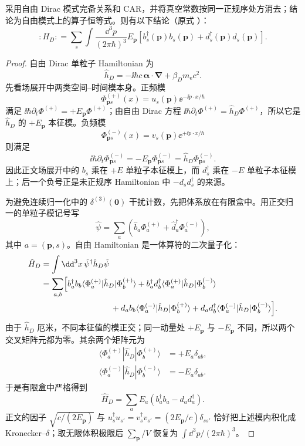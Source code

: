 \begin{proposition}
采用自由 Dirac 模式完备关系和 CAR，并将真空常数按同一正规序处方消去；结论为自由模式上的算子恒等式。则有以下结论（原式 ）：
\begin{equation*}
\boxed{
:\!H_D\!:
=\sum_s\int\frac{\dd^3 p}{(2\pi\hbar)^3}E_{\mathbf p}
\left[b_s^\dagger(\mathbf p)b_s(\mathbf p)
+d_s^\dagger(\mathbf p)d_s(\mathbf p)\right].}
\end{equation*}
\end{proposition}
\begin{proof}
自由 Dirac 单粒子 Hamiltonian 为
\[
 \hat h_D=-\ii\hbar c\,\boldsymbol\alpha\cdot\boldsymbol\nabla
 +\beta_Dm_{\mathrm e} c^2.
\]
先看场展开中两类空间--时间模本身。正频模
\[
 \Phi^{(+)}_{\mathbf p s}(x)
 =u_s(\mathbf p)\ee^{-\ii p\cdot x/\hbar}
\]
满足 $\ii\hbar\partial_t\Phi^{(+)}=+E_{\mathbf p}\Phi^{(+)}$；由自由 Dirac 方程
$\ii\hbar\partial_t\Phi^{(+)}=\hat h_D\Phi^{(+)}$，所以它是 $\hat h_D$ 的 $+E_{\mathbf p}$ 本征模。负频模
\[
 \Phi^{(-)}_{\mathbf p s}(x)
 =v_s(\mathbf p)\ee^{+\ii p\cdot x/\hbar}
\]
则满足
\[
 \ii\hbar\partial_t\Phi^{(-)}_{\mathbf p s}
 =-E_{\mathbf p}\Phi^{(-)}_{\mathbf p s}
 =\hat h_D\Phi^{(-)}_{\mathbf p s}.
\]
因此正文场展开中的 $b_s$ 乘在 $+E$ 单粒子本征模上，而 $d_s^\dagger$ 乘在 $-E$ 单粒子本征模上；后一个负号正是未正规序 Hamiltonian 中
$-d_sd_s^\dagger$ 的来源。

为避免连续归一化中的 $\delta^{(3)}(\mathbf0)$ 干扰计数，先把体系放在有限盒中。用正交归一的单粒子模记号写
\[
 \hat\psi
 =\sum_a\left(
 \hat b_a\Phi_a^{(+)}+\hat d_a^\dagger\Phi_a^{(-)}
 \right),
\]
其中 $a=(\mathbf p,s)$。自由 Hamiltonian 是一体算符的二次量子化：
\begin{align*}
 \hat H_D
 &=\int\dd^3x\,\hat\psi^\dagger\hat h_D\hat\psi\\
 &=\sum_{a,b}\Bigl[
 b_a^\dagger b_b\langle\Phi_a^{(+)}|\hat h_D|\Phi_b^{(+)}\rangle
 +b_a^\dagger d_b^\dagger\langle\Phi_a^{(+)}|\hat h_D|\Phi_b^{(-)}\rangle\\
 &\hspace{30mm}
 +d_a b_b\langle\Phi_a^{(-)}|\hat h_D|\Phi_b^{(+)}\rangle
 +d_a d_b^\dagger\langle\Phi_a^{(-)}|\hat h_D|\Phi_b^{(-)}\rangle
 \Bigr].
\end{align*}
由于 $\hat h_D$ 厄米，不同本征值的模正交；同一动量处 $+E_{\mathbf p}$ 与 $-E_{\mathbf p}$ 不同，所以两个交叉矩阵元都为零。其余两个矩阵元为
\begin{align*}
 \langle\Phi_a^{(+)}|\hat h_D|\Phi_b^{(+)}\rangle
 &=+E_a\delta_{ab},\\
 \langle\Phi_a^{(-)}|\hat h_D|\Phi_b^{(-)}\rangle
 &=-E_a\delta_{ab}.
\end{align*}
于是有限盒中严格得到
\begin{equation*}
 \hat H_D=\sum_a E_a
 \left(b_a^\dagger b_a-d_a d_a^\dagger\right).
\end{equation*}
正文的因子 $\sqrt{c/(2E_{\mathbf p})}$ 与
$u_s^\dagger u_{s'}=v_s^\dagger v_{s'}=(2E_{\mathbf p}/c)\delta_{ss'}$
恰好把上述模内积化成 Kronecker--$\delta$；取无限体积极限后
$\sum_{\mathbf p}/V$ 恢复为 $\int\dd^3p/(2\pi\hbar)^3$。


\end{proof}
